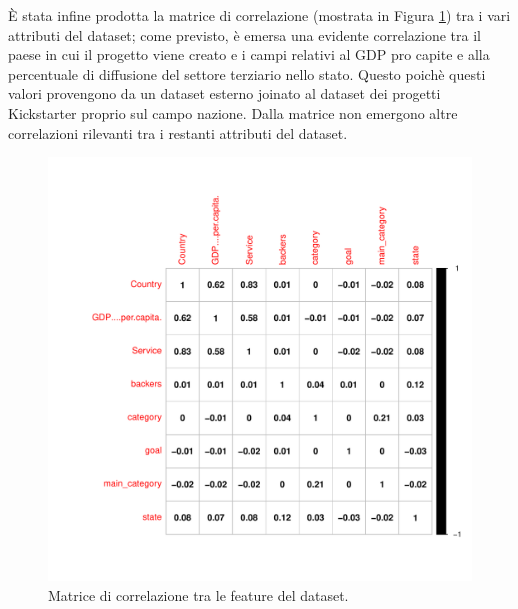 È stata infine prodotta la matrice di correlazione (mostrata in Figura \ref{fig:corrplot}) tra i vari attributi del dataset; come previsto, è emersa una evidente correlazione tra il paese in cui il progetto viene creato e i campi relativi al GDP pro capite e alla percentuale di diffusione del settore terziario nello stato. Questo poichè questi valori provengono da un dataset esterno joinato al dataset dei progetti Kickstarter proprio sul campo nazione. Dalla matrice non emergono altre correlazioni rilevanti tra i restanti attributi del dataset.

\begin{figure}
	\centering
	\includegraphics[width=1\linewidth]{../FinalResults/Images/Data_exploration_plots/corrplot}
	\caption{Matrice di correlazione tra le feature del dataset.}
	\label{fig:corrplot}
\end{figure}

